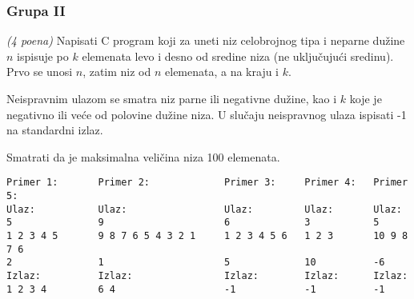 
\subsubsection{Grupa II}


\begin{Exercise}[label=v1.3_01] 
{\em (4 poena)}
Napisati C program koji za uneti niz  celobrojnog tipa i neparne 
dužine $n$ ispisuje po $k$ elemenata levo i desno od sredine 
niza (ne uključujući sredinu). Prvo se unosi $n$, zatim niz 
od $n$ elemenata, a na kraju i $k$.

Neispravnim ulazom se smatra niz parne ili negativne dužine, 
kao i $k$ koje je negativno ili veće od polovine dužine niza. 
U slučaju neispravnog ulaza ispisati -1 na standardni izlaz.

Smatrati da je maksimalna veličina niza 100 elemenata.
\begin{center}
\begin{verbatim}
Primer 1:       Primer 2:             Primer 3:     Primer 4:   Primer 5:
Ulaz:           Ulaz:                 Ulaz:         Ulaz:       Ulaz:
5               9                     6             3           5
1 2 3 4 5       9 8 7 6 5 4 3 2 1     1 2 3 4 5 6   1 2 3       10 9 8 7 6
2               1                     5             10          -6
Izlaz:          Izlaz:                Izlaz:        Izlaz:      Izlaz:
1 2 3 4         6 4                   -1            -1          -1
\end{verbatim}
\end{center}
\end{Exercise}
\begin{Answer}[ref=v1.3_01]
\end{Answer}


